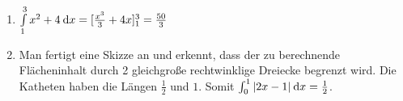 \item

\begin{enumerate}
\item $\int\limits_1^3 x^2+ 4 \:\mathrm{d}{x} = \lbrack \frac{x^3}{3}+4x\rbrack_1^3 = \frac{50}{3}$
\item Man fertigt eine Skizze an und erkennt, dass der zu berechnende Flächeninhalt durch 2 gleichgroße rechtwinklige Dreiecke begrenzt wird. Die Katheten haben die Längen $\frac{1}{2}$ und $1$. Somit $\int_0^1 |2x-1|\:\mathrm{d}{x} = \frac{1}{2}$.
\end{enumerate}

